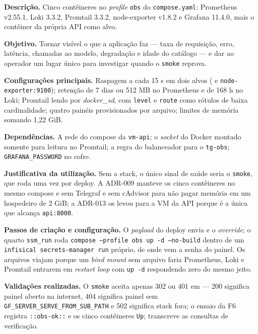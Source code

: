 \documentclass[11pt,a4paper]{article}
\begin{document}
\textbf{Descrição.} Cinco contêineres no \emph{profile} \texttt{obs} do \texttt{compose.yaml}:
Prometheus v2.55.1, Loki 3.3.2, Promtail 3.3.2, node-exporter v1.8.2 e Grafana 11.4.0, mais o
contêiner da própria API como alvo.

\textbf{Objetivo.} Tornar visível o que a aplicação faz --- taxa de requisição, erro, latência,
chamadas ao modelo, degradação e idade do catálogo --- e dar ao operador um lugar único para
investigar quando o \texttt{smoke} reprova.

\textbf{Configurações principais.} Raspagem a cada 15 s em dois alvos ( e
\texttt{node-exporter:9100}); retenção de 7 dias ou 512 MB no Prometheus e de 168 h no Loki;
Promtail lendo  por \emph{docker\_sd}, com
\texttt{level} e \texttt{route} como rótulos de baixa cardinalidade; quatro painéis provisionados por
arquivo; limites de memória somando 1,22 GiB.

\textbf{Dependências.} A rede do compose da \texttt{vm-api}; o \emph{socket} do Docker montado
somente para leitura no Promtail; a regra  do balanceador para o \texttt{tg-obs};
\texttt{GRAFANA\_PASSWORD} no cofre.

\textbf{Justificativa da utilização.} Sem a stack, o único sinal de saúde seria o \texttt{smoke}, que
roda uma vez por deploy. A ADR-009 manteve os cinco contêineres no mesmo compose e sem Telegraf e
sem cAdvisor para não pagar memória em um hospedeiro de 2 GiB; a ADR-013 os levou para a VM da API
porque é a única que alcança \texttt{api:8000}.

\textbf{Passos de criação e configuração.} O \emph{payload} do deploy envia
 e o \emph{override}; o quarto \texttt{ssm\_run} roda
\texttt{compose --profile obs up -d --no-build} dentro de um
\texttt{infisical secrets-manager run} próprio, de onde vem a senha do painel. Os arquivos viajam
porque um \emph{bind mount} sem arquivo faria Prometheus, Loki e Promtail entrarem em
\emph{restart loop} com \texttt{up -d} respondendo zero do mesmo jeito.

\textbf{Validações realizadas.} O \texttt{smoke} aceita apenas 302 ou 401 em  ---
200 significa painel aberto na internet, 404 significa painel sem
\texttt{GF\_\allowbreak{}SERVER\_\allowbreak{}SERVE\_\allowbreak{}FROM\_\allowbreak{}SUB\_\allowbreak{}PATH} e 502 significa stack fora; o ensaio da F6 registra
\texttt{::obs-ok::} e os cinco contêineres \texttt{Up}; 
transcreve as consultas de verificação.
\end{document}
